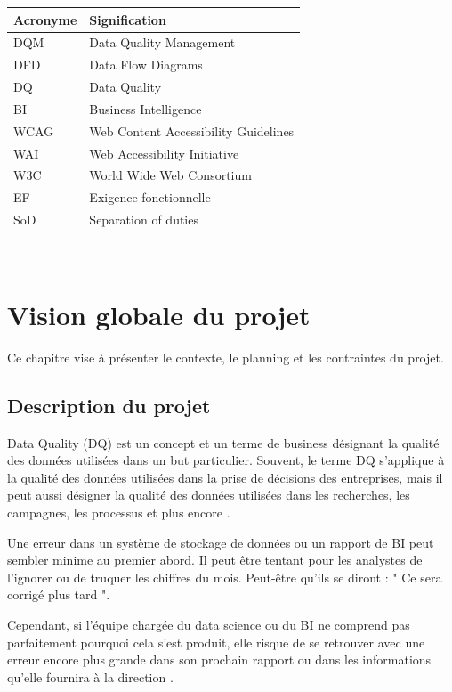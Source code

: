 \documentclass[oneside]{book}
\begin{document}
\begin{tabu} to 0.8\textwidth { | X[c] | X[c] | }
 \hline
 \textbf{Acronyme} & \textbf{Signification} \\
 \hline
 DQM  & Data Quality Management \\
\hline
DFD  & Data Flow Diagrams \\
\hline
DQ  & Data Quality \\
\hline
BI  & Business Intelligence \\
\hline
WCAG  & Web Content Accessibility Guidelines \\
\hline
WAI  & Web Accessibility Initiative \\
\hline
W3C  & World Wide Web Consortium \\
\hline
EF  & Exigence fonctionnelle \\
\hline
SoD  & Separation of duties \\
\hline

\end{tabu}
\\
\chapter{Vision globale du projet}
Ce chapitre vise à présenter le contexte, le planning et les contraintes du projet.
\section{Description du projet}

Data Quality (DQ) est un concept et un terme de business désignant la qualité des données utilisées dans un but particulier. Souvent, le terme DQ s'applique à la qualité des données utilisées dans la prise de décisions des entreprises, mais il peut aussi désigner la qualité des données utilisées dans les recherches, les campagnes, les processus et plus encore \cite{datacleaner}.

Une erreur dans un système de stockage de données ou un rapport de BI peut sembler minime au premier abord. Il peut être tentant pour les analystes de l'ignorer ou de truquer les chiffres du mois. Peut-être qu'ils se diront : " Ce sera corrigé plus tard "\cite{SeattleDataGuy}.

Cependant, si l'équipe chargée du data science ou du BI ne comprend pas parfaitement pourquoi cela s'est produit, elle risque de se retrouver avec une erreur encore plus grande dans son prochain rapport ou dans les informations qu'elle fournira à la direction \cite{SeattleDataGuy}.
\end{document}
